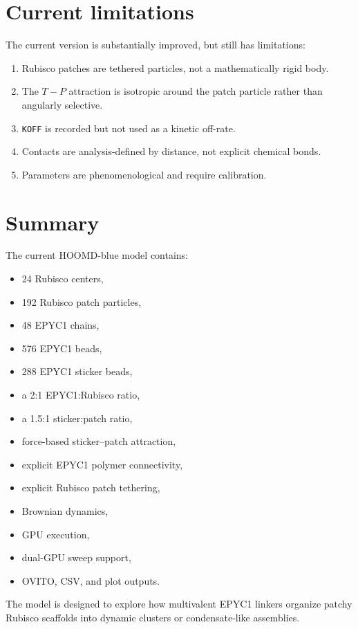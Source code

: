 \documentclass[11pt]{article}
\begin{document}
\section{Current limitations}

The current version is substantially improved, but still has limitations:
\begin{enumerate}[label=\arabic*.]
    \item Rubisco patches are tethered particles, not a mathematically rigid body.
    \item The \(T-P\) attraction is isotropic around the patch particle rather than angularly selective.
    \item \texttt{KOFF} is recorded but not used as a kinetic off-rate.
    \item Contacts are analysis-defined by distance, not explicit chemical bonds.
    \item Parameters are phenomenological and require calibration.
\end{enumerate}

\section{Summary}

The current HOOMD-blue model contains:
\begin{itemize}
    \item 24 Rubisco centers,
    \item 192 Rubisco patch particles,
    \item 48 EPYC1 chains,
    \item 576 EPYC1 beads,
    \item 288 EPYC1 sticker beads,
    \item a 2:1 EPYC1:Rubisco ratio,
    \item a 1.5:1 sticker:patch ratio,
    \item force-based sticker--patch attraction,
    \item explicit EPYC1 polymer connectivity,
    \item explicit Rubisco patch tethering,
    \item Brownian dynamics,
    \item GPU execution,
    \item dual-GPU sweep support,
    \item OVITO, CSV, and plot outputs.
\end{itemize}

The model is designed to explore how multivalent EPYC1 linkers organize patchy Rubisco scaffolds into dynamic clusters or condensate-like assemblies.
\end{document}
